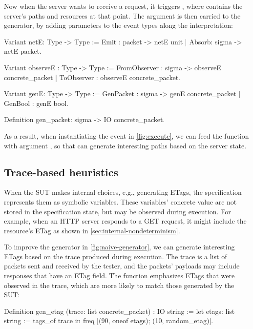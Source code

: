 Now when the server wants to receive a request, it triggers ,
where  contains the server's paths and resources at that
point.  The  argument is then carried to the generator, by adding
parameters to the event types along the interpretation:
\begin{coq}
  Variant netE: Type -> Type :=
    Emit  : packet -> netE unit
  | Absorb: sigma      -> netE packet.

  Variant observeE : Type -> Type :=
    FromObserver   : sigma -> observeE concrete_packet
  | ToObserver     : observeE concrete_packet.

  Variant genE: Type -> Type :=
    GenPacket : sigma -> genE concrete_packet
  | GenBool   : genE bool.

  Definition gen_packet: sigma -> IO concrete_packet.
\end{coq}

As a result, when instantiating the  event in
\autoref{fig:execute}, we can feed the  function with argument
, so that  can generate interesting paths based on the
server state.

\subsection{Trace-based heuristics}
\label{sec:heuristic-trace}

When the SUT makes internal choices, e.g., generating ETags, the
specification represents them as symbolic variables.  These variables' concrete
value are not stored in the specification state, but may be observed during
execution.  For example, when an HTTP server responds to a GET request, it might
include the resource's ETag as shown in \autoref{sec:internal-nondeterminism}.

To improve the generator in \autoref{fig:naive-generator}, we can generate
interesting ETags based on the trace produced during execution.  The trace is a
list of packets sent and received by the tester, and the packets' payloads may
include responses that have an ETag field.  The  function
emphasizes ETags that were observed in the trace, which are more likely to match
those generated by the SUT:
\begin{coq}
  Definition gen_etag (trace: list concrete_packet) : IO string :=
    let etags: list string := tags_of trace in
    freq [(90, oneof etags);
          (10, random_etag)].
\end{coq}

